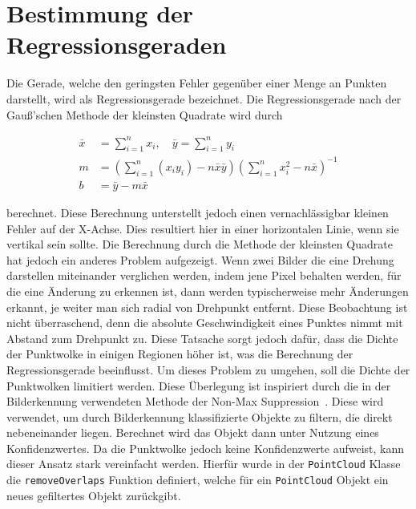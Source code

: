 \section{Bestimmung der Regressionsgeraden}\label{ch:bestimmung_regressionsgerade}

Die Gerade, welche den geringsten Fehler gegenüber einer Menge an Punkten darstellt, wird als Regressionsgerade bezeichnet.
Die Regressionsgerade nach der Gau{\ss}'schen Methode der kleinsten Quadrate wird durch~\cite[S.~694]{Papula2016}

\begin{equation}
    \begin{split}
        \bar{x} &= \sum_{i=1}^n x_i, \quad \bar{y} = \sum_{i=1}^n y_i \\
        m &= \left(\sum_{i=1}^n (x_i y_i) - n \bar{x} \bar{y}\right) \left(\sum_{i=1}^n x_i^2 - n \bar{x}\right)^{-1} \\
        b &= \bar{y} - m\bar{x}
    \end{split}
    \label{eq:regression_gauss}
\end{equation}

berechnet.
Diese Berechnung unterstellt jedoch einen vernachlässigbar kleinen Fehler auf der X-Achse.
Dies resultiert hier in einer horizontalen Linie, wenn sie vertikal sein sollte.
Die Berechnung durch die Methode der kleinsten Quadrate hat jedoch ein anderes Problem aufgezeigt.
Wenn zwei Bilder die eine Drehung darstellen miteinander verglichen werden, indem jene Pixel behalten werden, für die eine Änderung zu erkennen ist, dann werden typischerweise mehr Änderungen erkannt, je weiter man sich radial von Drehpunkt entfernt.
Diese Beobachtung ist nicht überraschend, denn die absolute Geschwindigkeit eines Punktes nimmt mit Abstand zum Drehpunkt zu.
Diese Tatsache sorgt jedoch dafür, dass die Dichte der Punktwolke in einigen Regionen höher ist, was die Berechnung der Regressionsgerade beeinflusst.
Um dieses Problem zu umgehen, soll die Dichte der Punktwolken limitiert werden.
Diese Überlegung ist inspiriert durch die in der Bilderkennung verwendeten Methode der Non-Max Suppression~\cite[S.~486]{Geron2019}.
Diese wird verwendet, um durch Bilderkennung klassifizierte Objekte zu filtern, die direkt nebeneinander liegen.
Berechnet wird das Objekt dann unter Nutzung eines Konfidenzwertes.
Da die Punktwolke jedoch keine Konfidenzwerte aufweist, kann dieser Ansatz stark vereinfacht werden.
Hierfür wurde in der \lstinline{PointCloud} Klasse die \lstinline{removeOverlaps} Funktion definiert, welche für ein \lstinline{PointCloud} Objekt ein neues gefiltertes Objekt zurückgibt.

